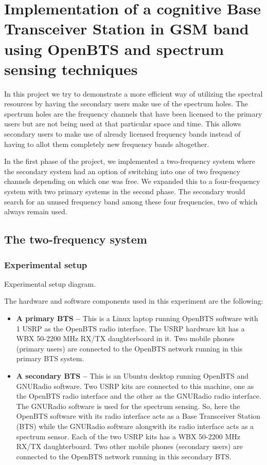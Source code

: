 \chapter{Implementation of a cognitive Base Transceiver Station in GSM band 
using OpenBTS and spectrum sensing techniques}

In this project we try to demonstrate a more efficient 
way of utilizing the spectral resources by having the secondary users
make use of the spectrum holes. The spectrum holes are the frequency channels
that have been licensed to the primary users but are not being used at that
particular space and time. This allows secondary users to make use of already 
licensed frequency bands instead of having to allot them completely new 
frequency bands altogether.

In the first phase of the project, we implemented a two-frequency system where
the secondary system had an option of switching into one of two frequency 
channels depending on which one was free. We expanded this to a four-frequency
system with two primary systems in the second phase. The secondary would 
search for an unused frequency band among these four frequencies, two of which
always remain used.

\section{The two-frequency system}
\subsection{Experimental setup}

Experimental setup diagram.

The hardware and software components used in this experiment are the 
following:
\begin{itemize}
    \item \textbf{A primary BTS --} This is a Linux laptop running OpenBTS
    software with 1 USRP as the OpenBTS radio interface. The USRP hardware kit
    has a WBX 50-2200 MHz RX/TX daughterboard in it. Two mobile phones 
    (primary users) are connected to the OpenBTS network running in this 
    primary BTS system.
    \item \textbf{A secondary BTS --} This is an Ubuntu desktop running
    OpenBTS and GNURadio software. Two USRP kits are connected to this
    machine, one as the OpenBTS radio interface and the other as the GNURadio
    radio interface. The GNURadio software is used for the spectrum sensing. 
    So, here the OpenBTS software with its radio interface acts as a Base
    Transceiver Station (BTS) while the GNURadio software alongwith its radio
    interface acts as a spectrum sensor. Each of the two USRP kits has a
    WBX 50-2200 MHz RX/TX daughterboard. Two other mobile phones (secondary 
    users) are connected to the OpenBTS network running in this secondary BTS.
\end{itemize}

